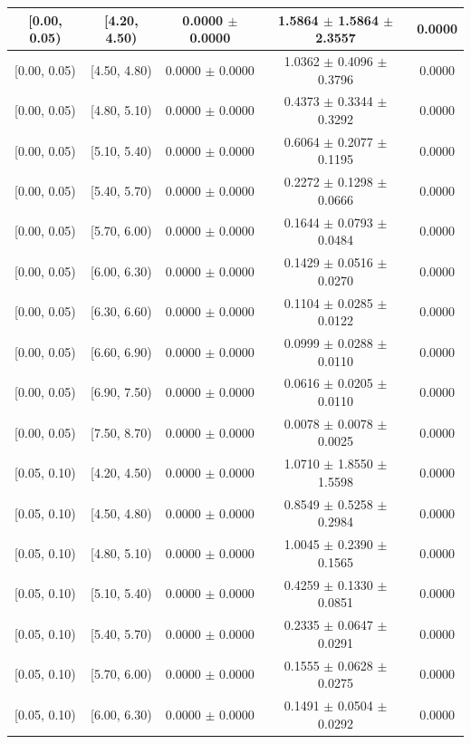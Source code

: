 \begin{longtable}{|c|c|c|c|c|}
\hline
\endlastfoot
[0.00, 0.05) & [4.20, 4.50) & 0.0000 $\pm$ 0.0000 & 1.5864 $\pm$ 1.5864 $\pm$ 2.3557 & 0.0000 \\ 
\hline
[0.00, 0.05) & [4.50, 4.80) & 0.0000 $\pm$ 0.0000 & 1.0362 $\pm$ 0.4096 $\pm$ 0.3796 & 0.0000 \\ 
\hline
[0.00, 0.05) & [4.80, 5.10) & 0.0000 $\pm$ 0.0000 & 0.4373 $\pm$ 0.3344 $\pm$ 0.3292 & 0.0000 \\ 
\hline
[0.00, 0.05) & [5.10, 5.40) & 0.0000 $\pm$ 0.0000 & 0.6064 $\pm$ 0.2077 $\pm$ 0.1195 & 0.0000 \\ 
\hline
[0.00, 0.05) & [5.40, 5.70) & 0.0000 $\pm$ 0.0000 & 0.2272 $\pm$ 0.1298 $\pm$ 0.0666 & 0.0000 \\ 
\hline
[0.00, 0.05) & [5.70, 6.00) & 0.0000 $\pm$ 0.0000 & 0.1644 $\pm$ 0.0793 $\pm$ 0.0484 & 0.0000 \\ 
\hline
[0.00, 0.05) & [6.00, 6.30) & 0.0000 $\pm$ 0.0000 & 0.1429 $\pm$ 0.0516 $\pm$ 0.0270 & 0.0000 \\ 
\hline
[0.00, 0.05) & [6.30, 6.60) & 0.0000 $\pm$ 0.0000 & 0.1104 $\pm$ 0.0285 $\pm$ 0.0122 & 0.0000 \\ 
\hline
[0.00, 0.05) & [6.60, 6.90) & 0.0000 $\pm$ 0.0000 & 0.0999 $\pm$ 0.0288 $\pm$ 0.0110 & 0.0000 \\ 
\hline
[0.00, 0.05) & [6.90, 7.50) & 0.0000 $\pm$ 0.0000 & 0.0616 $\pm$ 0.0205 $\pm$ 0.0110 & 0.0000 \\ 
\hline
[0.00, 0.05) & [7.50, 8.70) & 0.0000 $\pm$ 0.0000 & 0.0078 $\pm$ 0.0078 $\pm$ 0.0025 & 0.0000 \\ 
\hline
[0.05, 0.10) & [4.20, 4.50) & 0.0000 $\pm$ 0.0000 & 1.0710 $\pm$ 1.8550 $\pm$ 1.5598 & 0.0000 \\ 
\hline
[0.05, 0.10) & [4.50, 4.80) & 0.0000 $\pm$ 0.0000 & 0.8549 $\pm$ 0.5258 $\pm$ 0.2984 & 0.0000 \\ 
\hline
[0.05, 0.10) & [4.80, 5.10) & 0.0000 $\pm$ 0.0000 & 1.0045 $\pm$ 0.2390 $\pm$ 0.1565 & 0.0000 \\ 
\hline
[0.05, 0.10) & [5.10, 5.40) & 0.0000 $\pm$ 0.0000 & 0.4259 $\pm$ 0.1330 $\pm$ 0.0851 & 0.0000 \\ 
\hline
[0.05, 0.10) & [5.40, 5.70) & 0.0000 $\pm$ 0.0000 & 0.2335 $\pm$ 0.0647 $\pm$ 0.0291 & 0.0000 \\ 
\hline
[0.05, 0.10) & [5.70, 6.00) & 0.0000 $\pm$ 0.0000 & 0.1555 $\pm$ 0.0628 $\pm$ 0.0275 & 0.0000 \\ 
\hline
[0.05, 0.10) & [6.00, 6.30) & 0.0000 $\pm$ 0.0000 & 0.1491 $\pm$ 0.0504 $\pm$ 0.0292 & 0.0000 \\ 

\end{longtable}
